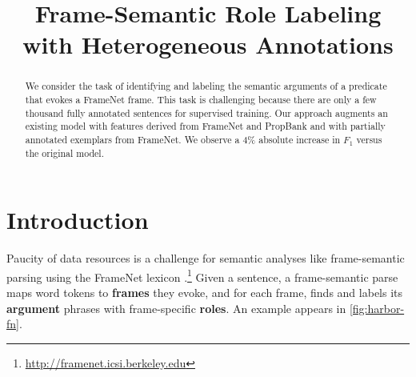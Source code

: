 \documentclass[11pt,a4paper]{article}
\title{Frame-Semantic Role Labeling with Heterogeneous Annotations}
\newcommand{\ensuretext}[1]{#1}
\newcommand{\nssmarker}{\ensuretext{\textcolor{magenta}{\ensuremath{^{\textsc{NS}}_{\textsc{S}}}}}}
\newcommand{\mkmarker}{\ensuretext{\textcolor{red}{\ensuremath{^{\textsc{M}}_{\textsc{K}}}}}}
\newcommand{\stmarker}{\ensuretext{\textcolor{orange}{\ensuremath{^{\textsc{S}}_{\textsc{T}}}}}}
\newcommand{\arkcomment}[3]{\ensuretext{\textcolor{#3}{[#1 #2]}}}
\newcommand{\nss}[1]{\arkcomment{\nssmarker}{#1}{magenta}}
\newcommand{\mk}[1]{\arkcomment{\mkmarker}{#1}{red}}
\newcommand{\st}[1]{\arkcomment{\stmarker}{#1}{orange}}
\begin{document}
\maketitle
\begin{abstract}
We consider the task of identifying and labeling the semantic
arguments of a predicate that evokes a FrameNet frame.  This task is
challenging because there are only a few thousand fully annotated
sentences for supervised training.  Our approach augments an existing %
model with features derived from FrameNet and PropBank and with
partially annotated exemplars from FrameNet.  We observe a 4\% absolute increase in $F_1$ 
versus the original model.

\end{abstract}

\section{Introduction}

Paucity of data resources is a challenge for semantic analyses like
frame-semantic parsing \citep{gildea-02,das-14} using the
FrameNet lexicon \citep{baker-98}.\footnote{\url{http://framenet.icsi.berkeley.edu}}
Given a sentence, a frame-semantic parse maps word tokens
to \textbf{frames} they evoke, and for each frame, finds and labels
its \textbf{argument} phrases  
with frame-specific \textbf{roles}. 
An example appears in \cref{fig:harbor-fn}. %
\end{document}
